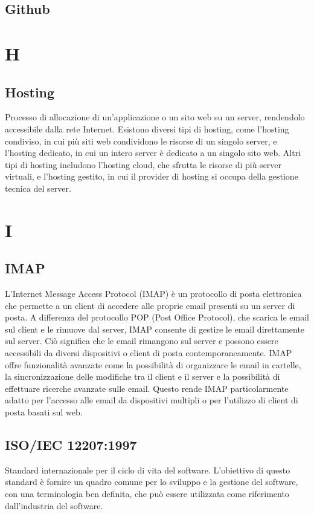 \documentclass[12pt]{article}
\begin{document}
		\subsection{Github}
	\clearpage
	\section{H}
		\subsection{Hosting}
		Processo di allocazione di un'applicazione o un sito web su un server, rendendolo accessibile dalla rete Internet. Esistono diversi tipi di hosting, come l'hosting condiviso, in cui più siti web condividono le risorse di un singolo server, e l'hosting dedicato, in cui un intero server è dedicato a un singolo sito web. Altri tipi di hosting includono l'hosting cloud, che sfrutta le risorse di più server virtuali, e l'hosting gestito, in cui il provider di hosting si occupa della gestione tecnica del server.
		
	\clearpage
	\section{I}
		\subsection{IMAP}
		L'Internet Message Access Protocol (IMAP) è un protocollo di posta elettronica che permette a un client di accedere alle proprie email presenti su un server di posta. A differenza del protocollo POP (Post Office Protocol), che scarica le email sul client e le rimuove dal server, IMAP consente di gestire le email direttamente sul server. Ciò significa che le email rimangono sul server e possono essere accessibili da diversi dispositivi o client di posta contemporaneamente. IMAP offre funzionalità avanzate come la possibilità di organizzare le email in cartelle, la sincronizzazione delle modifiche tra il client e il server e la possibilità di effettuare ricerche avanzate sulle email. Questo rende IMAP particolarmente adatto per l'accesso alle email da dispositivi multipli o per l'utilizzo di client di posta basati sul web.
		\subsection{ISO/IEC 12207:1997}
		Standard internazionale per il ciclo di vita del software. L'obiettivo di questo standard è fornire un quadro comune per lo sviluppo e la gestione del software, con una terminologia ben definita, che può essere utilizzata come riferimento dall'industria del software.
\end{document}
